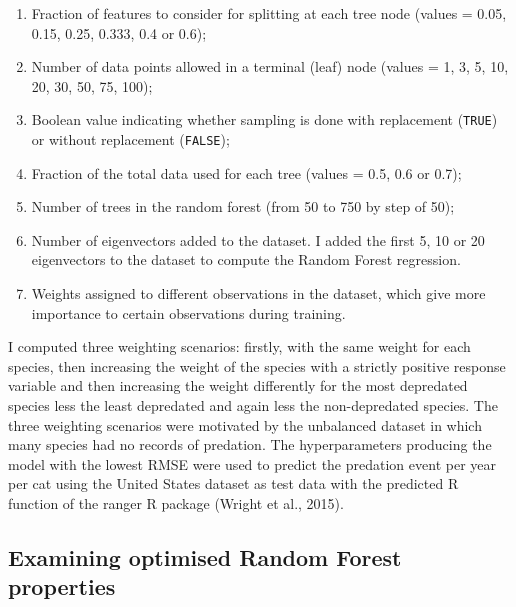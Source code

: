 \documentclass[
  super,
  review,
  3p]{elsarticle}
\begin{document}
\begin{enumerate}
\def\labelenumi{\arabic{enumi}.}
\item
  Fraction of features to consider for splitting at each tree node
  (values = 0.05, 0.15, 0.25, 0.333, 0.4 or 0.6);
\item
  Number of data points allowed in a terminal (leaf) node (values = 1,
  3, 5, 10, 20, 30, 50, 75, 100);
\item
  Boolean value indicating whether sampling is done with replacement
  (\texttt{TRUE}) or without replacement (\texttt{FALSE});
\item
  Fraction of the total data used for each tree (values = 0.5, 0.6 or
  0.7);
\item
  Number of trees in the random forest (from 50 to 750 by step of 50);
\item
  Number of eigenvectors added to the dataset. I added the first 5, 10
  or 20 eigenvectors to the dataset to compute the Random Forest
  regression.
\item
  Weights assigned to different observations in the dataset, which give
  more importance to certain observations during training.
\end{enumerate}

I computed three weighting scenarios: firstly, with the same weight for
each species, then increasing the weight of the species with a strictly
positive response variable and then increasing the weight differently
for the most depredated species less the least depredated and again less
the non-depredated species. The three weighting scenarios were motivated
by the unbalanced dataset in which many species had no records of
predation. The hyperparameters producing the model with the lowest RMSE
were used to predict the predation event per year per cat using the
United States dataset as test data with the predicted R function of the
ranger R package (Wright et al., 2015).

\hypertarget{examining-optimised-random-forest-properties}{%
\subsection{Examining optimised Random Forest
properties}\label{examining-optimised-random-forest-properties}}
\end{document}

